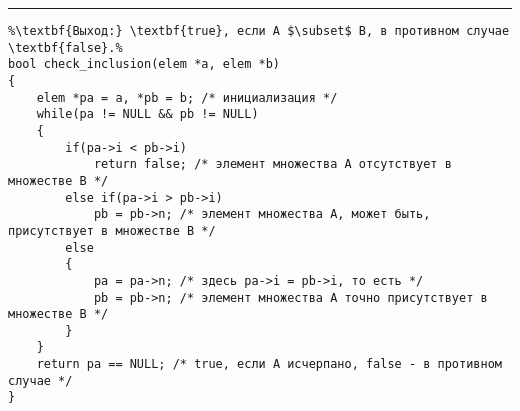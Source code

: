 \documentclass{article}
\begin{document}
\vspace{5pt} \hrule
\begin{lstlisting}[caption={Проверка включения слиянием}, label=p_42, escapechar=\%]
%\noindent\textbf{Вход:} Проверяемые множества A и B, которые заданы указателями a и b.\\%
%\textbf{Выход:} \textbf{true}, если A $\subset$ B, в противном случае \textbf{false}.%
bool check_inclusion(elem *a, elem *b)
{
	elem *pa = a, *pb = b; /* инициализация */
	while(pa != NULL && pb != NULL)
	{
		if(pa->i < pb->i)
			return false; /* элемент множества A отсутствует в множестве B */
		else if(pa->i > pb->i)
			pb = pb->n; /* элемент множества A, может быть, присутствует в множестве B */
		else
		{
			pa = pa->n; /* здесь pa->i = pb->i, то есть */
			pb = pb->n; /* элемент множества A точно присутствует в множестве B */
		}
	}
	return pa == NULL; /* true, если A исчерпано, false - в противном случае */
}
\end{lstlisting}
\end{document}
